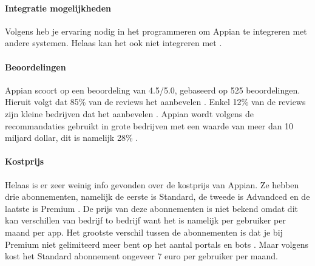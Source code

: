 \paragraph{Integratie mogelijkheden}
Volgens \textcite{Marvin2017} heb je ervaring nodig in het programmeren om Appian te integreren met andere systemen. 
Helaas kan het ook niet integreren met \textcite{MAKE.com2024a}.

\paragraph{Beoordelingen}
Appian scoort op \textcite{Gartner2024} een beoordeling van 4.5/5.0, gebaseerd op 525 beoordelingen. Hieruit volgt dat 85\% van de reviews het aanbevelen \autocite{Gartner2024}.
Enkel 12\% van de reviews zijn kleine bedrijven dat het aanbevelen \autocite{Gartner2024}. Appian wordt volgens de recommandaties gebruikt in grote bedrijven met een waarde van meer dan 10 miljard dollar, dit is namelijk 28\% \autocite{Gartner2024}.
\paragraph{Kostprijs}
Helaas is er zeer weinig info gevonden over de kostprijs van Appian. Ze hebben drie abonnementen, namelijk de eerste is 
Standard, de tweede is Advandced en de laatste is Premium \autocite{Appian2024}. De prijs van deze abonnementen is niet bekend omdat dit kan verschillen van bedrijf to bedrijf want het is namelijk 
per gebruiker per maand per app. Het grootste verschil tussen de abonnementen is dat je bij Premium niet gelimiteerd meer bent op het aantal portals en bots \autocite{Appian2024}. Maar volgens
\textcite{Shala} kost het Standard abonnement ongeveer 7 euro per gebruiker per maand.


